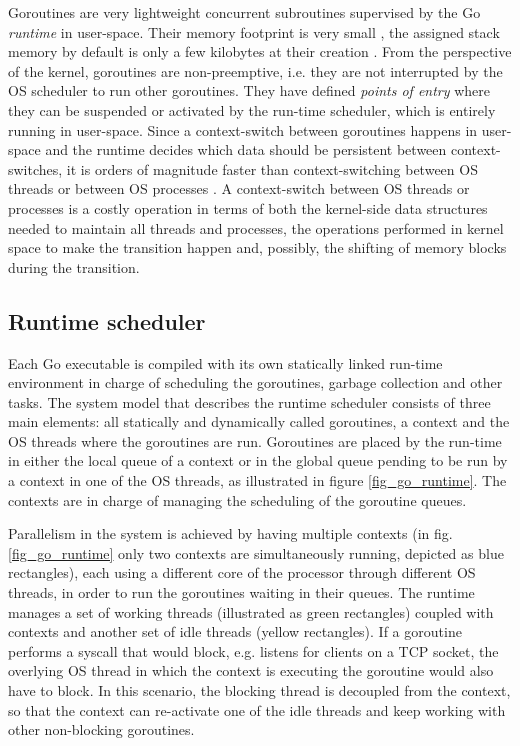 Goroutines are very lightweight concurrent subroutines  supervised by the Go \textit{runtime} in user-space. Their memory footprint is very small \cite{2013ContextSwitching}, the assigned stack memory by default is only a few kilobytes at their creation \cite{Cox-Buday2017}. From the perspective of the kernel, goroutines are non-preemptive, i.e. they are not interrupted by the OS scheduler to run other goroutines. They have defined \textit{points of entry} where they can be suspended or activated by the run-time scheduler, which is entirely running in user-space. Since a context-switch between goroutines happens in user-space and the runtime decides which data should be persistent between context-switches, it is orders of magnitude faster than context-switching between OS threads \cite{Cox-Buday2017} or between OS processes \cite{Kerrisk2010}. A context-switch between OS threads or processes is a costly operation in terms of both the kernel-side data structures needed to maintain all threads and processes, the operations performed in kernel space to make the transition happen and, possibly, the shifting of memory blocks during the transition.

\subsection{Runtime scheduler}
Each Go executable is compiled with its own statically linked run-time environment in charge of scheduling the goroutines, garbage collection and other tasks. The system model that describes the runtime scheduler consists of three main elements: all statically and dynamically called goroutines, a context and the OS threads where the goroutines are run. Goroutines are placed by the run-time in either the local queue of a context or in the global queue pending to be run by a context in one of the OS threads, as illustrated in figure \ref{fig_go_runtime}. The contexts are in charge of managing the scheduling of the goroutine queues.

Parallelism in the system is achieved by having multiple contexts (in fig. \ref{fig_go_runtime} only two contexts are simultaneously running, depicted as blue rectangles), each using a different core of the processor through different OS threads, in order to run the  goroutines waiting in their queues. The runtime manages a set of working threads (illustrated as green rectangles) coupled with contexts and another set of idle threads (yellow rectangles).  If a goroutine performs a syscall that would block, e.g. listens for clients on a TCP socket, the overlying OS thread in which the context is executing the goroutine would also have to block. In this scenario, the blocking thread is decoupled from the context, so that the context can re-activate one of the idle threads and keep working with other non-blocking goroutines.

